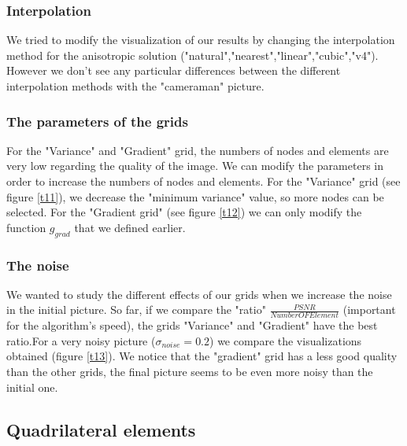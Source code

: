 \documentclass{report}
\begin{document}



\subsubsection{Interpolation}

We tried to modify the visualization of our results by changing the interpolation method for the anisotropic solution ("natural","nearest","linear","cubic","v4"). However we don't see any particular differences between the different interpolation methods with the "cameraman" picture. 




\subsubsection{The parameters of the grids}

For the "Variance" and "Gradient" grid, the numbers of nodes and elements are very low regarding the quality of the image. We can modify the parameters in order to increase the numbers of nodes and elements. 
For the "Variance" grid (see figure \ref{t11}), we decrease the "minimum variance" value, so more nodes can be selected. For the "Gradient grid" (see figure \ref{t12}) we can only modify the function $g_{grad}$ that we defined earlier. 






\subsubsection{The noise}


We wanted to study the different effects of our grids when we increase the noise in the initial picture. So far, if we compare the "ratio" $\frac{PSNR}{NumberOFElement}$ (important for the algorithm's speed), the grids "Variance" and "Gradient" have the best ratio.For a very noisy picture ($\sigma_{noise}=0.2$) we compare the visualizations obtained (figure \ref{t13}). We notice that the "gradient" grid has a less good quality than the other grids, the final picture seems to be even more noisy than the initial one.  







\subsection{Quadrilateral elements}
\end{document}
